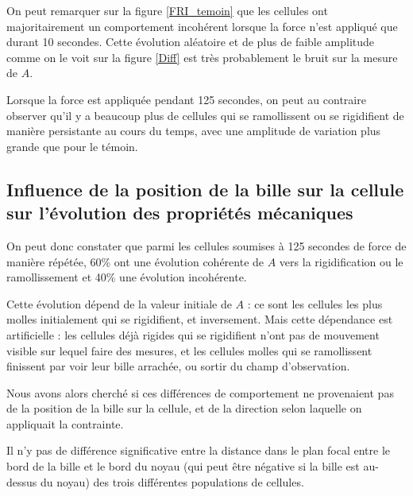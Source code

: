 \documentclass{report}
\begin{document}
On peut remarquer sur la figure \ref{FRI_temoin} que les cellules ont majoritairement un comportement incohérent lorsque la force n'est appliqué que durant 10 secondes.
Cette évolution aléatoire et de plus de faible amplitude comme on le voit sur la figure \ref{Diff} est très probablement le bruit sur la mesure de $A$. 

Lorsque la force est appliquée pendant 125 secondes, on peut au contraire observer qu'il y a beaucoup plus de cellules qui se ramollissent ou se rigidifient de manière persistante au cours du temps, avec une amplitude de variation plus grande que pour le témoin. 

\subsection{Influence de la position de la bille sur la cellule sur l'évolution des propriétés mécaniques}

On peut donc constater que parmi les cellules soumises à 125 secondes de force de manière répétée, 60\% ont une évolution cohérente de $A$ vers la rigidification ou le ramollissement et 40\% une évolution incohérente. 

Cette évolution dépend de la valeur initiale de $A$ : ce sont les cellules les plus molles initialement qui se rigidifient, et inversement. Mais cette dépendance est artificielle : les cellules déjà rigides qui se rigidifient n'ont pas de mouvement visible sur lequel faire des mesures, et les cellules molles qui se ramollissent finissent par voir leur bille arrachée, ou sortir du champ d'observation. 

Nous avons alors cherché si ces différences de comportement ne provenaient pas de la position de la bille sur la cellule, et de la direction selon laquelle on appliquait la contrainte. 

Il n'y pas de différence significative entre la distance dans le plan focal entre le bord de la bille et le bord du noyau (qui peut être négative si la bille est au-dessus du noyau) des trois différentes populations de cellules. 
\end{document}
